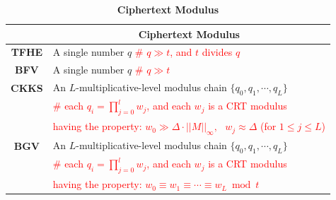 \begin{table}[h]
\begin{tabular}{|c||l|}
\hline
&\multicolumn{1}{c|}{\textbf{Ciphertext Modulus}}\\\hline\hline
\textbf{TFHE}&A single number $q$ \text{ } \textcolor{red}{ \# $q \gg t$, and $t$ divides $q$}\\\hline
\textbf{BFV}&A single number $q$ \text{ } \textcolor{red}{ \# $q \gg t$}\\\hline
\textbf{CKKS}&An $L$-multiplicative-level modulus chain $\{q_0, q_1, \cdots, q_L\}$\\
& \text{ } \textcolor{red}{ \# each $q_i = \prod\limits_{j=0}^{l}w_j$, and each $w_j$ is a CRT modulus}\\
&\text{ } \text{ } \text{ } \textcolor{red}{ having the property: $w_0 \gg \Delta \cdot ||M||_{\infty}, \text{ } w_j \approx \Delta$ (for $1 \leq j \leq L$)}\\\hline
\textbf{BGV}&An $L$-multiplicative-level modulus chain $\{q_0, q_1, \cdots, q_L\}$\\
&\text{ } \textcolor{red}{ \# each $q_i = \prod\limits_{j=0}^{l}w_j$, and each $w_j$ is a CRT modulus}\\
&\text{ } \text{ } \text{ } \textcolor{red}{ having the property: $w_0 \equiv w_1 \equiv \cdots \equiv w_L \bmod t$}\\\hline
\end{tabular}
\caption{\textbf{Ciphertext Modulus}}
\end{table}



